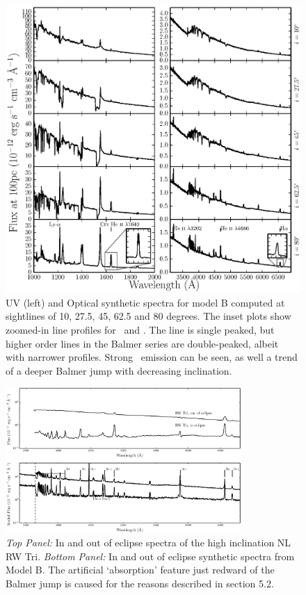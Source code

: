 \documentclass[preprint, a4paper, 11pt]{aastex}
\begin{document}
\begin{figure} %
\includegraphics[width=\textwidth]{figures/fig14_uv_opt.eps}
\caption{
UV (left) and Optical synthetic spectra for model B computed at
sightlines of 10, 27.5, 45, 62.5 and 80 degrees.	
The inset plots show zoomed-in line profiles for 
\heiiuv\ and \ha. The \ha line 
is single peaked, but higher order lines in the Balmer series
are double-peaked, albeit with narrower profiles.
Strong \heiiopt\ emission can be seen, as well a trend
of a deeper Balmer jump with decreasing inclination.
}
\label{uvoptb}
\end{figure} %


\begin{figure} %
\includegraphics[width=0.8\textwidth]{figures/fig13_eclipse.eps}
\caption{{\sl Top Panel:} In and out of eclipse spectra of the high
inclination NL RW Tri. {\sl Bottom Panel:} In and out of eclipse synthetic
spectra from Model B.
The artificial `absorption' feature just redward of the Balmer jump
is caused for the reasons described in section 5.2.}
\label{rwtricomp}
\end{figure} %
\end{document}
